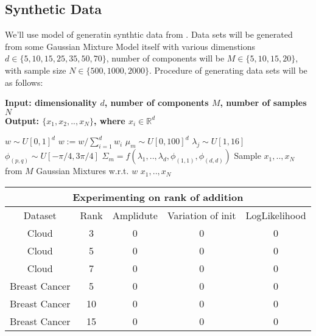 \documentclass[a4paper]{article}
\begin{document}
\subsection{Synthetic Data}

We'll use model of generatin synthtic data from \cite{ARI20122804}. Data sets will be generated from some Gaussian Mixture Model itself with
 various dimenstions $d \in \{5, 10, 15, 25, 35, 50, 70\}$, number of components will be $M \in \{5, 10, 15, 20\}$, with sample size $N \in \{500, 1000, 2000\}$.
Procedure of generating data sets will be as follows:

\begin{algorithm}
    \caption{}\label{alg:cap}
    \hspace*{\algorithmicindent} \textbf{Input: dimensionality $d$, number of components $M$, number of samples $N$} \\
    \hspace*{\algorithmicindent} \textbf{Output: $\{x_1, x_2, .., x_N\}$, where $x_i \in \mathbb{R}^d$}
    \begin{algorithmic}
        \State $w \sim U[0, 1]^d$
        \State $w := w / \sum_{i=1}^d w_i$
            \State $\mu_m \sim U[0, 100]^d$
                \State $\lambda_j  \sim U[1, 16]$ 
                    \State $\phi_{(p,q)} \sim U[-\pi/4, 3\pi/4]$ 
                \EndFor
                \State
            \State $\Sigma_m = f(\lambda_1, .., \lambda_d, \phi_{(1, 1)}, \phi_{(d, d)})$ 
            \EndFor
            \State Sample $x_1, .., x_N$ from $M$ Gaussian Mixtures w.r.t. $w$ 
        \EndFor 
        \State \Return $x_1, .., x_N$
    \end{algorithmic}
\end{algorithm}


\begin{center}
    \begin{tabular}{||c c c c c||} 
     \hline
     \multicolumn{5}{|c|}{Experimenting on rank of addition} \\
     \hline
     Dataset & Rank & Amplidute & Variation of init & LogLikelihood \\ [0.5ex] 
     \hline\hline
     Cloud & 3 & 0 & 0 & 0\\ 
     \hline
     Cloud & 5 & 0 & 0 & 0\\
     \hline
     Cloud & 7 & 0 & 0 & 0\\
     \hline
     Breast Cancer & 5 & 0 & 0 & 0\\
     \hline
     Breast Cancer & 10 & 0 & 0 & 0\\
     \hline
     Breast Cancer & 15 & 0 & 0 & 0\\ [1ex] 
     \hline
    \end{tabular}
\end{center}
\end{document}
